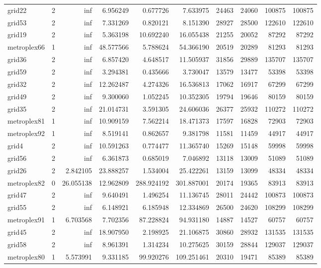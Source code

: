 \begin{longtable}{|l|r|r|r|r|r|r|r|r|r|}
grid22 & 2 & inf & 6.956249 & 0.677726 & 7.633975 & 24463 & 24060 & 100875 & 100875 \\
grid53 & 2 & inf & 7.331269 & 0.820121 & 8.151390 & 28927 & 28500 & 122610 & 122610 \\
grid19 & 2 & inf & 5.363198 & 10.692240 & 16.055438 & 21255 & 20052 & 87292 & 87292 \\
metroplex66 & 1 & inf & 48.577566 & 5.788624 & 54.366190 & 20519 & 20289 & 81293 & 81293 \\
grid36 & 2 & inf & 6.857420 & 4.648517 & 11.505937 & 31856 & 29889 & 135707 & 135707 \\
grid59 & 2 & inf & 3.294381 & 0.435666 & 3.730047 & 13579 & 13477 & 53398 & 53398 \\
grid32 & 2 & inf & 12.262487 & 4.274326 & 16.536813 & 17062 & 16917 & 67299 & 67299 \\
grid49 & 2 & inf & 9.300060 & 1.052245 & 10.352305 & 19794 & 19646 & 80159 & 80159 \\
grid35 & 2 & inf & 21.014731 & 3.591305 & 24.606036 & 26377 & 25932 & 110272 & 110272 \\
metroplex81 & 1 & inf & 10.909159 & 7.562214 & 18.471373 & 17597 & 16828 & 72903 & 72903 \\
metroplex92 & 1 & inf & 8.519141 & 0.862657 & 9.381798 & 11581 & 11459 & 44917 & 44917 \\
grid4 & 2 & inf & 10.591263 & 0.774477 & 11.365740 & 15269 & 15148 & 59998 & 59998 \\
grid56 & 2 & inf & 6.361873 & 0.685019 & 7.046892 & 13118 & 13009 & 51089 & 51089 \\
grid26 & 2 & 2.842105 & 23.888257 & 1.534004 & 25.422261 & 13159 & 13099 & 48334 & 48334 \\
metroplex82 & 0 & 26.055138 & 12.962809 & 288.924192 & 301.887001 & 20174 & 19365 & 83913 & 83913 \\
grid47 & 2 & inf & 9.640491 & 1.496254 & 11.136745 & 28011 & 24442 & 100873 & 100873 \\
grid55 & 2 & inf & 6.148921 & 6.185948 & 12.334869 & 26500 & 24620 & 108299 & 108299 \\
metroplex91 & 1 & 6.703568 & 7.702356 & 87.228824 & 94.931180 & 14887 & 14527 & 60757 & 60757 \\
grid45 & 2 & inf & 18.907950 & 2.198925 & 21.106875 & 30860 & 28932 & 131535 & 131535 \\
grid58 & 2 & inf & 8.961391 & 1.314234 & 10.275625 & 30159 & 28844 & 129037 & 129037 \\
metroplex80 & 1 & 5.573991 & 9.331185 & 99.920276 & 109.251461 & 20310 & 19471 & 85389 & 85389 \\

\end{longtable}
